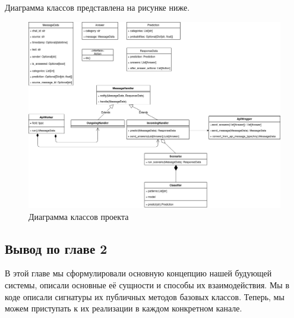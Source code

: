     Диаграмма классов представлена на рисунке ниже.
    \begin{figure}[!h]
        \centering
        \includegraphics[width=\linewidth]{static/ClassDiagram.png}
        \caption{Диаграмма классов проекта}
        \label{fig:class-diagram}
    \end{figure}


    \subsection*{Вывод по главе 2}
    В этой главе мы сформулировали основную концепцию нашей будующей системы, описали основные
    её сущности и способы их взаимодействия. Мы в коде описали сигнатуры их публичных методов базовых
    классов.
    Теперь, мы можем приступать к их реализации в каждом конкретном канале.
